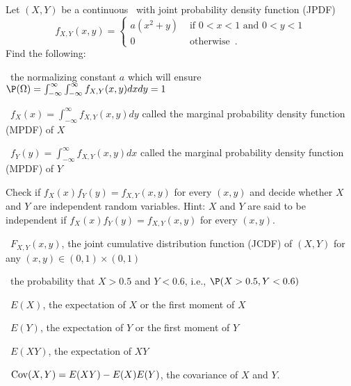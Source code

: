 \begin{ExerciseList}
\Exercise
Let $(X,Y)$ be a continuous \rv~with joint probability density function (JPDF)
\[
f_{X,Y}(x,y)
=
\begin{cases}
a (x^2+y) & \text{ if } 0 < x < 1 \text{ and } 0 < y < 1\\
0 & \text{ otherwise} \enspace .
\end{cases}
\]
Find the following:
\be
\item~the normalizing constant $a$ which will ensure $\P(\Omega) = \int_{-\infty}^{\infty}\int_{-\infty}^{\infty} f_{X,Y}(x,y) dx dy = 1$
\item~$f_X(x) = \int_{-\infty}^{\infty} f_{X,Y}(x,y) dy$ called the marginal probability density function (MPDF) of $X$
\item~$f_Y(y) = \int_{-\infty}^{\infty} f_{X,Y}(x,y) dx$ called the marginal probability density function (MPDF) of $Y$
\item Check if $f_X(x)f_Y(y)=f_{X,Y}(x,y)$ for every $(x,y)$ and decide whether $X$ and $Y$ are independent random variables.  {Hint: $X$ and $Y$ are said to be independent if $f_X(x)f_Y(y)=f_{X,Y}(x,y)$ for every $(x,y)$.}
\item~$F_{X,Y}(x,y)$, the joint cumulative distribution function (JCDF) of $(X,Y)$ for any $(x,y) \in (0,1) \times (0,1)$ 
\item~the probability that $X > 0.5$ and $Y<0.6$, i.e., $\P(X>0.5,Y<0.6)$
\item~$E(X)$, the expectation of $X$ or the first moment of $X$
\item~$E(Y)$, the expectation of $Y$ or the first moment of $Y$
\item~$E(XY)$, the expectation of $XY$
\item~$\mathop{\rm Cov}(X,Y)=E(XY)-E(X)E(Y)$, the covariance of $X$ and $Y$.
\ee


\end{ExerciseList}
